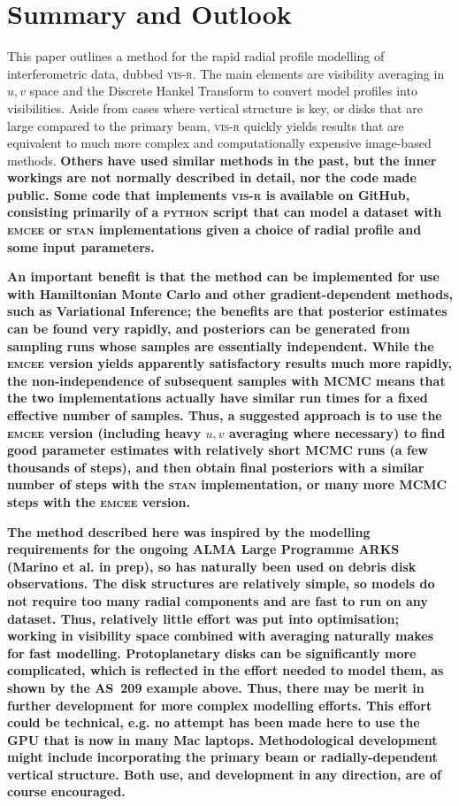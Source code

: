 \documentclass[fleqn,usenatbib]{mnras}
\begin{document}
\section{Summary and Outlook}

This paper outlines a method for the rapid radial profile modelling of interferometric data, dubbed \textsc{vis-r}. The main elements are visibility averaging in $u,v$ space and the Discrete Hankel Transform to convert model profiles into visibilities. Aside from cases where vertical structure is key, or disks that are large compared to the primary beam, \textsc{vis-r} quickly yields results that are equivalent to much more complex and computationally expensive image-based methods. \textbf{Others have used similar methods in the past, but the inner workings are not normally described in detail, nor the code made public. Some code that implements \textsc{vis-r} is available on GitHub, consisting primarily of a \textsc{python} script that can model a dataset with \textsc{emcee} or \textsc{stan} implementations given a choice of radial profile and some input parameters.}

\textbf{An important benefit is that the method can be implemented for use with Hamiltonian Monte Carlo and other gradient-dependent methods, such as Variational Inference; the benefits are that posterior estimates can be found very rapidly, and posteriors can be generated from sampling runs whose samples are essentially independent. While the \textsc{emcee} version yields apparently satisfactory results much more rapidly, the non-independence of subsequent samples with MCMC means that the two implementations actually have similar run times for a fixed effective number of samples. Thus, a suggested approach is to use the \textsc{emcee} version (including heavy $u,v$ averaging where necessary) to find good parameter estimates with relatively short MCMC runs (a few thousands of steps), and then obtain final posteriors with a similar number of steps with the \textsc{stan} implementation, or many more MCMC steps with the \textsc{emcee} version.}

\textbf{The method described here was inspired by the modelling requirements for the ongoing ALMA Large Programme ARKS (Marino et al. in prep), so has naturally been used on debris disk observations. The disk structures are relatively simple, so models do not require too many radial components and are fast to run on any dataset. Thus, relatively little effort was put into optimisation; working in visibility space combined with averaging naturally makes for fast modelling. Protoplanetary disks can be significantly more complicated, which is reflected in the effort needed to model them, as shown by the AS~209 example above. Thus, there may be merit in further development for more complex modelling efforts. This effort could be technical, e.g. no attempt has been made here to use the GPU that is now in many Mac laptops. Methodological development might include incorporating the primary beam or radially-dependent vertical structure. Both use, and development in any direction, are of course encouraged.}
\end{document}
